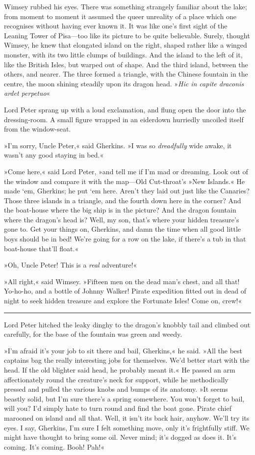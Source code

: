 Wimsey rubbed his eyes. There was something strangely familiar about the lake; from moment to moment it assumed the queer unreality of a place which one recognises without having ever known it. It was like one's first sight of the Leaning Tower of Pisa—too like its picture to be quite believable. Surely, thought Wimsey, he knew that elongated island on the right, shaped rather like a winged monster, with its two little clumps of buildings. And the island to the left of it, like the British Isles, but warped out of shape. And the third island, between the others, and nearer. The three formed a triangle, with the Chinese fountain in the centre, the moon shining steadily upon its dragon head. »\textit{Hic in capite draconis ardet perpetuo}\longdash«

Lord Peter sprang up with a loud exclamation, and flung open the door into the dressing-room. A small figure wrapped in an eiderdown hurriedly uncoiled itself from the window-seat.

»I'm sorry, Uncle Peter,« said Gherkins. »I was so \textit{dreadfully} wide awake, it wasn't any good staying in bed.«

»Come here,« said Lord Peter, »and tell me if I'm mad or dreaming. Look out of the window and compare it with the map—Old Cut-throat's »New Islands.« He made `em, Gherkins; he put `em here. Aren't they laid out just like the Canaries? Those three islands in a triangle, and the fourth down here in the corner? And the boat-house where the big ship is in the picture? And the dragon fountain where the dragon's head is? Well, my son, that's where your hidden treasure's gone to. Get your things on, Gherkins, and damn the time when all good little boys should be in bed! We're going for a row on the lake, if there's a tub in that boat-house that'll float.«

»Oh, Uncle Peter! This is a \textit{real} adventure!«

»All right,« said Wimsey. »Fifteen men on the dead man's chest, and all that! Yo-ho-ho, and a bottle of Johnny Walker! Pirate expedition fitted out in dead of night to seek hidden treasure and explore the Fortunate Isles! Come on, crew!«

\noindent\hfil\rule{0.5\textwidth}{.4pt}\hfil 

Lord Peter hitched the leaky dinghy to the dragon's knobbly tail and climbed out carefully, for the base of the fountain was green and weedy.

»I'm afraid it's your job to sit there and bail, Gherkins,« he said. »All the best captains bag the really interesting jobs for themselves. We'd better start with the head. If the old blighter said head, he probably meant it.« He passed an arm affectionately round the creature's neck for support, while he methodically pressed and pulled the various knobs and bumps of its anatomy. »It seems beastly solid, but I'm sure there's a spring somewhere. You won't forget to bail, will you? I'd simply hate to turn round and find the boat gone. Pirate chief marooned on island and all that. Well, it isn't its back hair, anyhow. We'll try its eyes. I say, Gherkins, I'm sure I felt something move, only it's frightfully stiff. We might have thought to bring some oil. Never mind; it's dogged as does it. It's coming. It's coming. Booh! Pah!«

